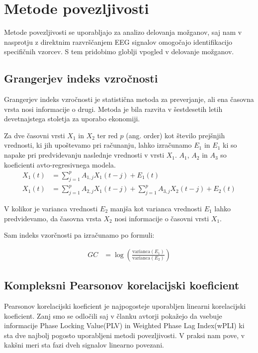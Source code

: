 \section{Metode povezljivosti}
Metode povezljivosti se uporabljajo za analizo delovanja možganov, saj nam v nasprotju z direktnim razvrščanjem EEG signalov omogočajo identifikacijo specifičnih vzorcev. S tem pridobimo globlji vpogled v delovanje možganov.

\subsection{Grangerjev indeks vzročnosti}
Grangerjev indeks vzročnosti je statistična metoda za preverjanje, ali ena časovna vrsta nosi informacije o drugi. Metoda je bila razvita v šestdesetih letih devetnajstega stoletja za uporabo ekonomiji.\cite{cohenAnalyzingNeuralTime2014}

Za dve časovni vrsti $X_1$ in $X_2$ ter red $p$ (ang. order) kot število prejšnjih vrednosti, ki jih upoštevamo pri računanju, lahko izračunamo $E_1$ in $E_1$ ki so napake pri predvidevanju naslednje vrednosti v vrsti $X_1$. $A_1$, $A_2$ in $A_3$ so koeficienti avto-regresivnega modela. \cite{sethGrangerCausality2007}
\begin{align*}
X_1(t) &= \sum_{j=1}^{p} A_{1,j} X_1(t-j) + E_1(t)\\
X_1(t) &= \sum_{j=1}^{p} A_{2,j} X_1(t-j) + \sum_{j=1}^{p} A_{3,j} X_2(t-j) + E_2(t)
\end{align*}

V kolikor je varianca vrednosti $E_2$ manjša kot varianca vrednosti $E_1$ lahko predvidevamo, da časovna vrsta $X_2$ nosi informacije o časovni vrsti $X_1$.  \cite{sethGrangerCausality2007}

Sam indeks vzorčnosti pa izračunamo po formuli:

\begin{align*}
GC &= \log \left( \frac{\mathrm{varianca}(E_1)}{\mathrm{varianca}(E_2)} \right)
\end{align*}

\subsection{Kompleksni Pearsonov korelacijski koeficient}
Pearsonov korelacijski koeficient je najpogosteje uporabljen linearni korelacijski koeficient. Zanj smo se odločili saj v članku  
avtorji pokažejo da vsebuje informacije Phase Locking Value(PLV) in Weighted Phase Lag Index(wPLI) ki sta dve najbolj pogosto uporabljeni metodi povezljivosti. V praksi nam pove, v kakšni meri sta fazi dveh signalov linearno povezani.\cite{sverkoComplexPearsonCorrelation2022} 

